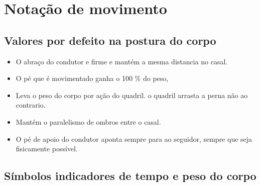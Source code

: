 




\chapter{Notação de movimento}





\section{Valores por defeito na postura do corpo}


\begin{itemize}
\item O abraço do condutor e firme e mantém a mesma distancia no casal.
\item O pé que é movimentado ganha o 100 $\%$ do peso,
\item Leva o peso do corpo por ação do quadril. o quadril arrasta a perna não ao contrario.
\item Mantém o paralelismo de ombros entre o casal.
\item O pé de apoio do condutor aponta sempre para ao seguidor, sempre que seja fisicamente possível.
\end{itemize}


\section{Símbolos indicadores de tempo e peso do corpo}

